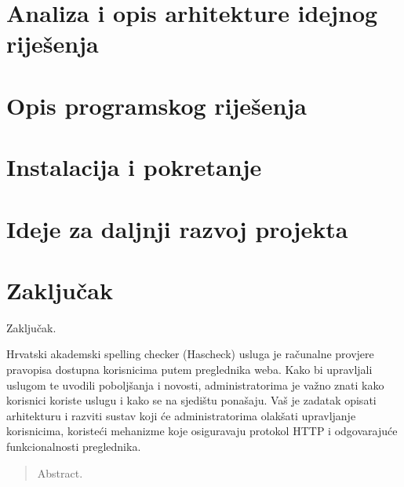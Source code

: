 \documentclass[times, utf8, zavrsni]{fer}
\begin{document}
\chapter{Analiza i opis arhitekture idejnog riješenja}

\chapter{Opis programskog riješenja}

\chapter{Instalacija i pokretanje}

\chapter{Ideje za daljnji razvoj projekta}

\chapter{Zaključak}
Zaključak.




\begin{sazetak}
Hrvatski akademski spelling checker (Hascheck) usluga je računalne provjere
pravopisa dostupna korisnicima putem preglednika weba. Kako bi upravljali
uslugom te uvodili poboljšanja i novosti, administratorima je važno znati
kako korisnici koriste uslugu i kako se na sjedištu ponašaju. Vaš je zadatak
opisati arhitekturu i razviti sustav koji će administratorima olakšati
upravljanje korisnicima, koristeći mehanizme koje osiguravaju protokol HTTP i
odgovarajuće funkcionalnosti preglednika.

\end{sazetak}

\begin{abstract}
Abstract.

\end{abstract}
\end{document}
